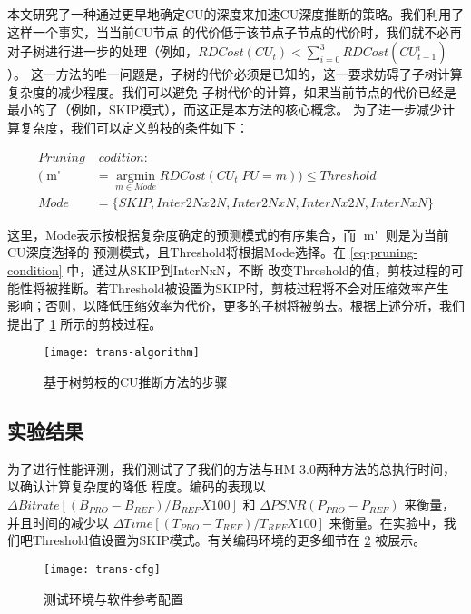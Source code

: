 本文研究了一种通过更早地确定CU的深度来加速CU深度推断的策略。我们利用了这样一个事实，当当前CU节点
的代价低于该节点子节点的代价时，我们就不必再对子树进行进一步的处理（例如，$RDCost(CU_t) < \sum_{i=0}^3 RDCost(CU^i_{t-1})$）。
这一方法的唯一问题是，子树的代价必须是已知的，这一要求妨碍了子树计算复杂度的减少程度。我们可以避免
子树代价的计算，如果当前节点的代价已经是最小的了（例如，SKIP模式），而这正是本方法的核心概念。
为了进一步减少计算复杂度，我们可以定义剪枝的条件如下：

\begin{equation}
\label{eq-pruning-condition}
\begin{split}
Pruning & \; codition: \\
(\mathop{m'} & =  \mathop{argmin}\limits_{m \in Mode} RDCost(CU_t | PU=m)) \le Threshold \\
Mode & = \{ SKIP, Inter2Nx2N, Inter2NxN, InterNx2N, InterNxN \} 
\end{split}
\end{equation}

这里，Mode表示按根据复杂度确定的预测模式的有序集合，而 $\mathop{m'}$ 则是为当前CU深度选择的
预测模式，且Threshold将根据Mode选择。在 \ref{eq-pruning-condition} 中，通过从SKIP到InterNxN，不断
改变Threshold的值，剪枝过程的可能性将被推断。若Threshold被设置为SKIP时，剪枝过程将不会对压缩效率产生
影响；否则，以降低压缩效率为代价，更多的子树将被剪去。根据上述分析，我们提出了 \ref{fig:trans-algorithm} 
所示的剪枝过程。


\begin{figure}[H] %
  \centering
  \texttt{[image: trans-algorithm]}
  \caption{基于树剪枝的CU推断方法的步骤}
  \label{fig:trans-algorithm}
\end{figure}

\subsection{实验结果}

为了进行性能评测，我们测试了了我们的方法与HM 3.0两种方法的总执行时间，以确认计算复杂度的降低
程度。编码的表现以 $\Delta Bitrate[ (B_{PRO} - B_{REF})/B_{REF} X 100 ]$ 和 
$ \Delta PSNR(P_{PRO} - P_{REF})$ 来衡量，并且时间的减少以 $ \Delta Time[ (T_{PRO} - T_{REF})/T_{REF} X 100 ]$
来衡量。在实验中，我们吧Threshold值设置为SKIP模式。有关编码环境的更多细节在 \ref{fig:trans-cfg} 被展示。

\begin{figure}[H] %
  \centering
  \texttt{[image: trans-cfg]}
  \caption{测试环境与软件参考配置}
  \label{fig:trans-cfg}
\end{figure}

